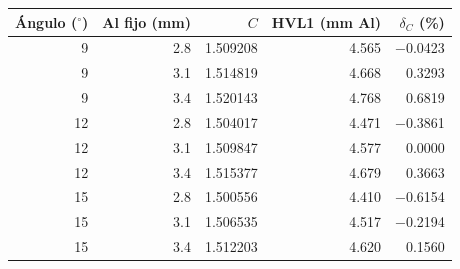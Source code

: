 \begin{tabular}{rrrrr}\toprule
Ángulo ($^\circ$) & Al fijo (mm) & $C$ & HVL1 (mm Al) & $\delta_C$ (\%)\\\midrule
\num{9} & \num{2.8} & \num{1.509208} & \num{4.565} & \num{-0.0423}\\
\num{9} & \num{3.1} & \num{1.514819} & \num{4.668} & \num{0.3293}\\
\num{9} & \num{3.4} & \num{1.520143} & \num{4.768} & \num{0.6819}\\
\num{12} & \num{2.8} & \num{1.504017} & \num{4.471} & \num{-0.3861}\\
\num{12} & \num{3.1} & \num{1.509847} & \num{4.577} & \num{0.0000}\\
\num{12} & \num{3.4} & \num{1.515377} & \num{4.679} & \num{0.3663}\\
\num{15} & \num{2.8} & \num{1.500556} & \num{4.410} & \num{-0.6154}\\
\num{15} & \num{3.1} & \num{1.506535} & \num{4.517} & \num{-0.2194}\\
\num{15} & \num{3.4} & \num{1.512203} & \num{4.620} & \num{0.1560}\\
\bottomrule\end{tabular}